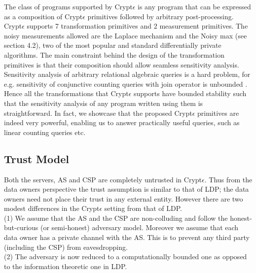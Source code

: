 {The class of programs supported by Crypt$\epsilon$ is any program that can be expressed as a composition of  Crypt$\epsilon$ primitives followed by arbitrary post-processing. Crypt$\epsilon$ supports 7 transformation primitives and 2 measurement primitives. The noisy measurements allowed are the Laplace mechanism and the Noisy max (see section 4.2), two of the most popular and standard differentially private algorithms. The main constraint behind the design of the transformation primitives is that their composition should allow seamless sensitivity analysis.  Sensitivity analysis of arbitrary relational algebraic queries is a hard problem, for e.g. sensitivity of conjunctive counting queries with join operator is unbounded \cite{sensitivity}. Hence all the transformations that Crypt$\epsilon$ supports have bounded stability \cite{PINQ} such that the sensitivity analysis of any program written using them is straightforward. In fact, we showcase that the proposed Crypt$\epsilon$ primitives are indeed very powerful, enabling us to answer practically useful queries, such as linear counting queries etc. 
\\ 
}





\subsection{Trust Model}
Both the servers, \textsf{AS} and \textsf{CSP} are completely untrusted in Crypt$\epsilon$. 
Thus from the data owners perspective the trust assumption is similar to that of \textsf{LDP}; the data owners need not place their trust in any external entity. 
However there are two modest differences in the Crypt$\epsilon$ setting from that of \textsf{LDP}.\\
 (1) We assume that the \textsf{AS} and the \textsf{CSP} are non-colluding and follow the honest-but-curious (or semi-honest) adversary model. %
 Moreover we assume that each data owner has a private channel with the \textsf{AS}. This is to prevent any third party (including the \textsf{CSP}) from eavesdropping. \\
 (2) The adversary is now reduced to a computationally bounded one as opposed to the information theoretic one  in \textsf{LDP}.
 
 
